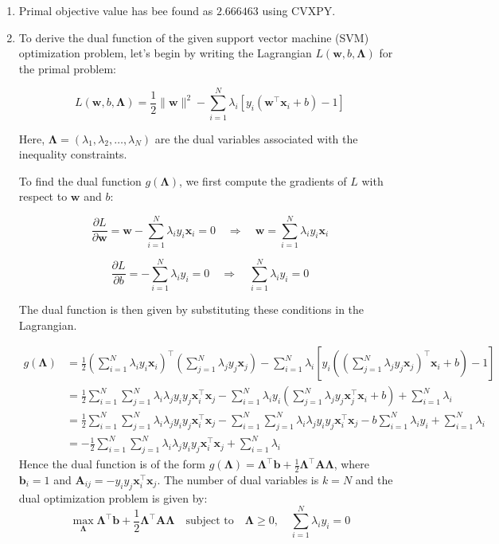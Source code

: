 \documentclass[12pt,a4paper]{article}
\theoremstyle{remark}
\begin{document}
\begin{enumerate}
    \item Primal objective value has bee found as $2.666463$ using CVXPY.
    \item To derive the dual function of the given support vector machine (SVM) optimization problem, let's begin by writing the Lagrangian \( L(\mathbf{w}, b, \mathbf{\Lambda}) \) for the primal problem:

    \[
    L(\mathbf{w}, b, \mathbf{\Lambda}) = \frac{1}{2} \|\mathbf{w}\|^2 - \sum_{i=1}^N \lambda_i [ y_i (\mathbf{w}^\top \mathbf{x}_i + b) - 1 ]
    \]
    
    Here, \( \mathbf{\Lambda} = (\lambda_1, \lambda_2, \ldots, \lambda_N) \) are the dual variables associated with the inequality constraints.
    
    To find the dual function \( g(\mathbf{\Lambda})\), we first compute the gradients of \( L \) with respect to \( \mathbf{w} \) and \( b \):
    
    \[
    \frac{\partial L}{\partial \mathbf{w}} = \mathbf{w} - \sum_{i=1}^N \lambda_i y_i \mathbf{x}_i = 0 \quad \Rightarrow \quad \mathbf{w} = \sum_{i=1}^N \lambda_i y_i \mathbf{x}_i
    \]
    
    \[
    \frac{\partial L}{\partial b} = -\sum_{i=1}^N \lambda_i y_i = 0 \quad \Rightarrow \quad \sum_{i=1}^N \lambda_i y_i = 0
    \]
    
    The dual function is then given by substituting these conditions in the Lagrangian.

    \begin{align*}
        g(\mathbf{\Lambda}) &= \frac{1}{2} \left( \sum_{i=1}^N \lambda_i y_i \mathbf{x}_i \right)^\top \left( \sum_{j=1}^N \lambda_j y_j \mathbf{x}_j \right) - \sum_{i=1}^N \lambda_i [ y_i \left( \left( \sum_{j=1}^N \lambda_j y_j \mathbf{x}_j \right)^\top \mathbf{x}_i + b \right) - 1 ] \\
        &= \frac{1}{2} \sum_{i=1}^N \sum_{j=1}^N \lambda_i \lambda_j y_i y_j \mathbf{x}_i^\top \mathbf{x}_j - \sum_{i=1}^N \lambda_i y_i \left( \sum_{j=1}^N \lambda_j y_j \mathbf{x}_j^\top \mathbf{x}_i + b \right) + \sum_{i=1}^N \lambda_i \\
        &= \frac{1}{2} \sum_{i=1}^N \sum_{j=1}^N \lambda_i \lambda_j y_i y_j \mathbf{x}_i^\top \mathbf{x}_j - \sum_{i=1}^N \sum_{j=1}^N \lambda_i \lambda_j y_i y_j \mathbf{x}_i^\top \mathbf{x}_j - b \sum_{i=1}^N \lambda_i y_i + \sum_{i=1}^N \lambda_i \\
        &= -\frac{1}{2} \sum_{i=1}^N \sum_{j=1}^N \lambda_i \lambda_j y_i y_j \mathbf{x}_i^\top \mathbf{x}_j + \sum_{i=1}^N \lambda_i
    \end{align*}
    Hence the dual function is of the form \( g(\mathbf{\Lambda}) = \mathbf{\Lambda}^\top \mathbf{b} + \frac{1}{2} \mathbf{\Lambda}^\top \mathbf{A} \mathbf{\Lambda} \), where \( \mathbf{b}_i = 1 \) and \( \mathbf{A}_{ij} = - y_i y_j \mathbf{x}_i^\top \mathbf{x}_j \). The number of dual variables is \( k = N \) and the dual optimization problem is given by:
    $$ \max_{\mathbf{\Lambda}} \mathbf{\Lambda}^\top \mathbf{b} + \frac{1}{2} \mathbf{\Lambda}^\top \mathbf{A} \mathbf{\Lambda} \quad \text{subject to} \quad \mathbf{\Lambda} \geq 0, \quad \sum_{i=1}^N \lambda_i y_i = 0 $$


\end{enumerate}
\end{document}
